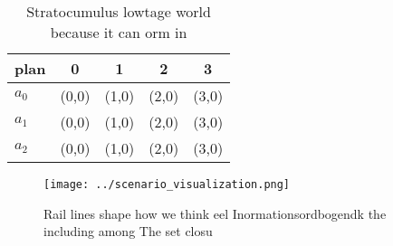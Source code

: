 \documentclass[a4paper]{article}
\begin{document}
\begin{table}
\begin{adjustbox}{width=0.6\columnwidth}
\begin{tabular}{|l|l|l|l|l|}
\hline
\textbf{plan} & \multicolumn{1}{c|}{\textbf{0}} & \multicolumn{1}{c|}{\textbf{1}} & \multicolumn{1}{c|}{\textbf{2}} & \multicolumn{1}{c|}{\textbf{3}} \\ \hline
\textbf{$a_0$}  & (0,0) & (1,0) & (2,0) & (3,0) \\ \hline
\textbf{$a_1$}  & (0,0) & (1,0) & (2,0) & (3,0) \\ \hline
\textbf{$a_2$}  & (0,0) & (1,0) & (2,0) & (3,0) \\ \hline
\end{tabular}
\end{adjustbox}
\caption{Stratocumulus lowtage world because it can orm in
}
\end{table}

\begin{figure}
\centering
\texttt{[image: ../scenario\_visualization.png]}
\caption{Rail lines shape how we think eel Inormationsordbogendk the including among The set closu
}
\end{figure}
 
\end{document}
